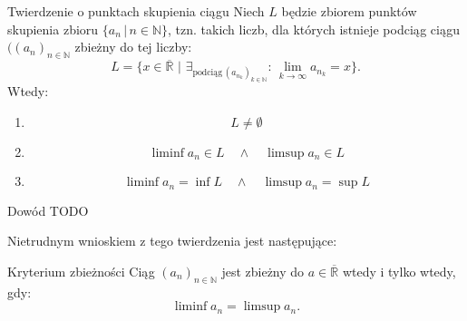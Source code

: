 \documentclass{article}
\newcommand{\R}{\mathbb{R}}
\newcommand{\Rbar}{\overline{\mathbb{R}}}
\newcommand{\N}{\mathbb{N}}
\newcommand{\ciag}[1]{(#1_{n})_{n \in \N}}
\begin{document}
    \begin{twier}{Twierdzenie o punktach skupienia ciągu}
        Niech $L$ będzie zbiorem punktów skupienia zbioru $\{a_n \, | \, n \in \N\}$, tzn. takich liczb, dla których istnieje podciąg ciągu $(\ciag{a}$ zbieżny do tej liczby: \begin{equation}
            L = \{ x \in \overline{\R} \,\, | \,\, \exists_{\text{podciąg} \, (a_{n_k})_{k \in \N}} : \, \lim_{k \to \infty} a_{n_k} = x \}.
        \end{equation}
        Wtedy:
        \begin{enumerate}
            \item \begin{equation}
                L \neq \emptyset
            \end{equation}
            \item \begin{equation}
                \liminf{a_n} \in L  \quad \land \quad \limsup{a_n} \in L
            \end{equation}
            \item \begin{equation}
                \liminf{a_n} = \inf{L} \quad \land \quad \limsup{a_n} = \sup{L}
            \end{equation}
        \end{enumerate}
    \end{twier}

    \begin{dow}{Dowód}
        TODO
    \end{dow}

    Nietrudnym wnioskiem z tego twierdzenia jest następujące:
    \begin{twier}{Kryterium zbieżności}
        Ciąg $\ciag{a}$ jest zbieżny do $a \in \Rbar$ wtedy i tylko wtedy, gdy: \begin{equation}
            \liminf a_n = \limsup a_n.
        \end{equation}
    \end{twier}
\end{document}
